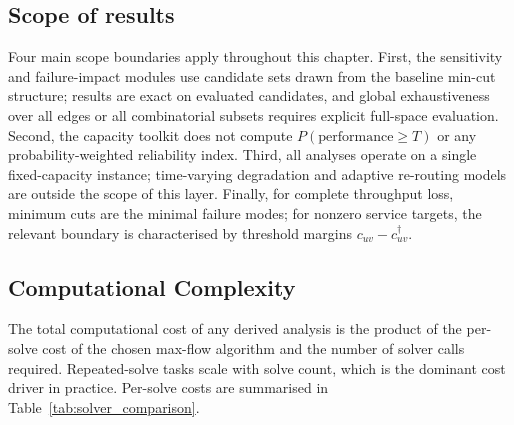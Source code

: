 \documentclass[12pt]{report}
\begin{document}
\subsection{Scope of results}
Four main scope boundaries apply throughout this chapter.
First, the sensitivity and failure-impact modules use candidate sets drawn from the baseline min-cut structure; results are exact on evaluated candidates, and global exhaustiveness over all edges or all combinatorial subsets requires explicit full-space evaluation. Second, the capacity toolkit does not compute $P(\text{performance}\ge T)$ or any probability-weighted reliability index. Third, all analyses operate on a single fixed-capacity instance; time-varying degradation and adaptive re-routing models are outside the scope of this layer. Finally, for complete throughput loss, minimum cuts are the minimal failure modes; for nonzero service targets, the relevant boundary is characterised by threshold margins 
$c_{uv} - c^\dagger_{uv}$.

\subsection{Computational Complexity}
The total computational cost of any derived analysis is the product of the per-solve cost of the chosen max-flow algorithm and the number of solver calls required.  Repeated-solve tasks scale with solve count, which is the dominant cost driver in practice. Per-solve costs are summarised in Table~\ref{tab:solver_comparison}.
\end{document}
